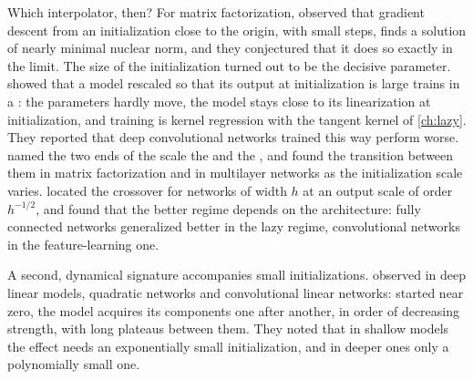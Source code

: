 \begin{refsection}
Which interpolator, then? For matrix factorization, \textcite{GunasekarEtAl2017} observed that gradient descent from an initialization close to the origin, with small steps, finds a solution of nearly minimal nuclear norm, and they conjectured that it does so exactly in the limit. The size of the initialization turned out to be the decisive parameter. \Textcite{ChizatOyallonBach2019} showed that a model rescaled so that its output at initialization is large trains in a : the parameters hardly move, the model stays close to its linearization at initialization, and training is kernel regression with the tangent kernel of \cref{ch:lazy}. They reported that deep convolutional networks trained this way perform worse. \Textcite{WoodworthEtAl2020} named the two ends of the scale the  and the , and found the transition between them in matrix factorization and in multilayer networks as the initialization scale varies. \Textcite{GeigerEtAl2020} located the crossover for networks of width $h$ at an output scale of order $h^{-1/2}$, and found that the better regime depends on the architecture: fully connected networks generalized better in the lazy regime, convolutional networks in the feature-learning one.

A second, dynamical signature accompanies small initializations. \Textcite{GissinShalevShwartzDaniely2020} observed  in deep linear models, quadratic networks and convolutional linear networks: started near zero, the model acquires its components one after another, in order of decreasing strength, with long plateaus between them. They noted that in shallow models the effect needs an exponentially small initialization, and in deeper ones only a polynomially small one.



\end{refsection}
